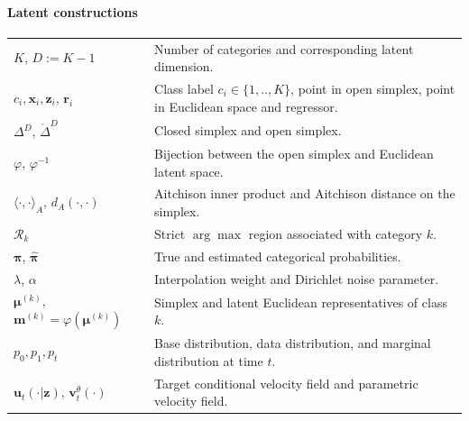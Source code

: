 \newpage
\paragraph{Latent constructions}
\begin{center}
\renewcommand{\arraystretch}{1.15}
\begin{tabular}{@{}p{}p{}@{}}
$K$, $D:=K-1$ & Number of categories and corresponding latent dimension. \\
$c_i, \boldsymbol{x}_i, \boldsymbol{z}_i$, $\boldsymbol{r}_i$ & Class label $c_i\in \{1,..,K\}$, point in open simplex, point in Euclidean space and regressor. \\
$\Delta^{D}$, $\mathring{\Delta}^{D}$ & Closed simplex and open simplex. \\
$\varphi$, $\varphi^{-1}$ & Bijection between the open simplex and Euclidean latent space. \\
$\langle\cdot,\cdot\rangle_A$, $d_A(\cdot,\cdot)$ & Aitchison inner product and Aitchison distance on the simplex. \\
$\mathcal{R}_k$ & Strict $\arg\max$ region associated with category $k$. \\
$\boldsymbol{\pi}$, $\hat{\boldsymbol{\pi}}$ & True and estimated categorical probabilities. \\
$\lambda$, $\alpha$ & Interpolation weight and Dirichlet noise parameter. \\
$\boldsymbol{\mu}^{(k)}$, $\boldsymbol{m}^{(k)}=\varphi(\boldsymbol{\mu}^{(k)})$ & Simplex and latent Euclidean representatives of class $k$. \\
$p_0,p_1,p_t$ & Base distribution, data distribution, and marginal distribution at time $t$. \\
$\boldsymbol{u}_t(\cdot|\boldsymbol{z})$, $\boldsymbol{v}_t^{\theta}(\cdot)$ & Target conditional velocity field and parametric velocity field.  
\end{tabular}
\end{center}
